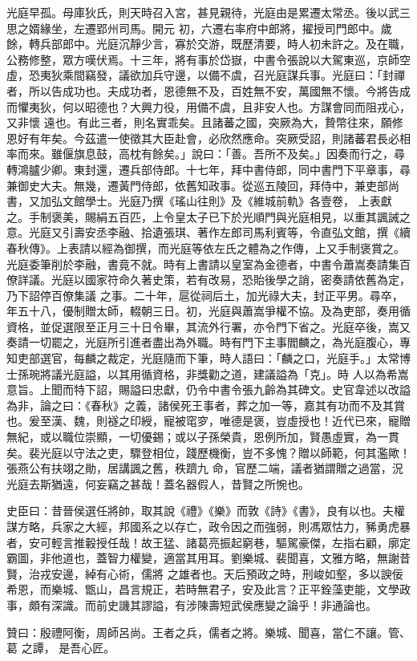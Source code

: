 \begin{pinyinscope}
 光庭早孤。母庫狄氏，則天時召入宮，甚見親待，光庭由是累遷太常丞。後以武三思之婿緣坐，左遷郢州司馬。開元
 初，六遷右率府中郎將，擢授司門郎中。歲餘，轉兵部郎中。光庭沉靜少言，寡於交游，既歷清要，時人初未許之。及在職，公務修整，眾方嘆伏焉。十三年，將有事於岱嶽，中書令張說以大駕東巡，京師空虛，恐夷狄乘間竊發，議欲加兵守邊，以備不虞，召光庭謀兵事。光庭曰：「封禪者，所以告成功也。夫成功者，恩德無不及，百姓無不安，萬國無不懷。今將告成而懼夷狄，何以昭德也？大興力役，用備不虞，且非安人也。方謀會同而阻戎心，又非懷
 遠也。有此三者，則名實乖矣。且諸蕃之國，突厥為大，贄幣往來，願修恩好有年矣。今茲遣一使徵其大臣赴會，必欣然應命。突厥受詔，則諸蕃君長必相率而來。雖偃旗息鼓，高枕有餘矣。」說曰：「善。吾所不及矣。」因奏而行之，尋轉鴻臚少卿。東封還，遷兵部侍郎。十七年，拜中書侍郎，同中書門下平章事，尋兼御史大夫。無幾，遷黃門侍郎，依舊知政事。從巡五陵回，拜侍中，兼吏部尚書，又加弘文館學士。光庭乃撰《瑤山往則》及《維城前軌》各壹卷，
 上表獻之。手制褒美，賜絹五百匹，上令皇太子已下於光順門與光庭相見，以重其諷誡之意。光庭又引壽安丞李融、拾遺張琪、著作左郎司馬利賓等，令直弘文館，撰《續春秋傳》。上表請以經為御撰，而光庭等依左氏之體為之作傳，上又手制褒賞之。光庭委筆削於李融，書竟不就。時有上書請以皇室為金德者，中書令蕭嵩奏請集百僚詳議。光庭以國家符命久著史策，若有改易，恐貽後學之誚，密奏請依舊為定，乃下詔停百僚集議
 之事。二十年，扈從祠后土，加光祿大夫，封正平男。尋卒，年五十八，優制贈太師，輟朝三日。初，光庭與蕭嵩爭權不協。及為吏部，奏用循資格，並促選限至正月三十日令畢，其流外行署，亦令門下省之。光庭卒後，嵩又奏請一切罷之，光庭所引進者盡出為外職。時有門下主事閻麟之，為光庭腹心，專知吏部選官，每麟之裁定，光庭隨而下筆，時人語曰：「麟之口，光庭手。」太常博士孫琬將議光庭謚，以其用循資格，非獎勸之道，建議謚為「克」。時
 人以為希嵩意旨。上聞而特下詔，賜謚曰忠獻，仍令中書令張九齡為其碑文。史官韋述以改謚為非，論之曰：《春秋》之義，諸侯死王事者，葬之加一等，嘉其有功而不及其賞也。爰至漢、魏，則襚之印綬，寵被窀穸，唯德是褒，豈虛授也！近代已來，寵贈無紀，或以職位崇顯，一切優錫；或以子孫榮貴，恩例所加，賢愚虛實，為一貫矣。裴光庭以守法之吏，驟登相位，踐歷機衡，豈不多愧？贈以師範，何其濫歟！張燕公有扶翊之勛，居講諷之舊，秩躋九
 命，官歷二端，議者猶謂贈之過當，況光庭去斯猶遠，何妄竊之甚哉！蓋名器假人，昔賢之所惋也。



 史臣曰：昔晉侯選任將帥，取其說《禮》《樂》而敦《詩》《書》，良有以也。夫權謀方略，兵家之大經，邦國系之以存亡，政令因之而強弱，則馮眾怙力，豨勇虎暴者，安可輕言推轂授任哉！故王猛、諸葛亮振起窮巷，驅駕豪傑，左指右顧，廓定霸圖，非他道也，蓋智力權變，適當其用耳。劉樂城、裴聞喜，文雅方略，無謝昔賢，治戎安邊，綽有心術，儒將
 之雄者也。天后預政之時，刑峻如壑，多以諛佞希恩，而樂城、甑山，昌言規正，若時無君子，安及此言？正平銓藻吏能，文學政事，頗有深識。而前史譏其謬謚，有涉陳壽短武侯應變之論乎！非通論也。



 贊曰：殷禮阿衡，周師呂尚。王者之兵，儒者之將。樂城、聞喜，當仁不讓。管、葛
 之譚，
 是吾心匠。



\end{pinyinscope}